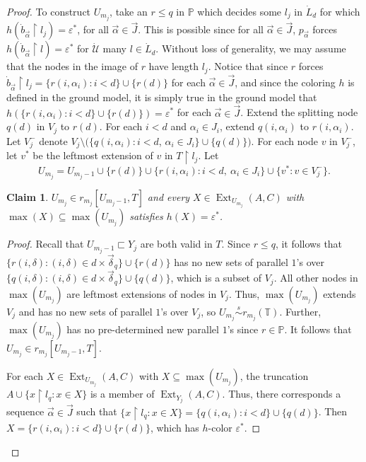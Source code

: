 \documentclass{amsart}
\newtheorem{claim}{Claim}
\theoremstyle{remark}
\theoremstyle{definition}
\theoremstyle{remark}
\newcommand{\al}{\alpha}
\newcommand{\sse}{\subseteq}
\DeclareMathOperator{\Ext}{Ext}
\newcommand{\re}{\restriction}
\newcommand{\bP}{\mathbb{P}}
\newcommand{\bT}{\mathbb{T}}
\newcommand{\ssim}{\stackrel{s}{\sim}}
\begin{document}
\begin{proof}
To construct $U_{m_j}$,
take an $r\le q$ in  $\bP$ which  decides some $l_j$ in $\dot{L}_d$ for which   $h(\dot{b}_{\vec\al}\re l_j)=\varepsilon^*$, for all $\vec\al\in\vec{J}$.
This is possible since for all $\vec\al\in\vec{J}$,
$p_{\vec\al}$ forces $h(\dot{b}_{\vec\al}\re l)=\varepsilon^*$ for $\dot{\mathcal{U}}$ many $l\in \dot{L}_d$.
Without loss of generality, we may assume that
 the nodes in the image of $r$ have length  $l_j$.
Notice that since
$r$ forces $\dot{b}_{\vec{\al}}\re l_j=\{r(i,\al_i):i<d\}\cup\{r(d)\}$ for each $\vec\al\in \vec{J}$,
and since the coloring $h$ is defined in the ground model,
it is simply true in the ground model that
$h(\{r(i,\al_i):i<d\}\cup\{r(d)\})=\varepsilon^*$ for each $\vec\al\in \vec{J}$.
Extend the splitting node $q(d)$ in $V_j$
to $r(d)$.
For each $i<d$ and $\al_i\in J_i$,
extend $q(i,\al_i)$ to $r(i,\al_i)$.
Let $V_j^-$ denote  $V_j\setminus(\{q(i,\al_i):i<d$, $\al_i\in J_i\}\cup \{q(d)\})$.
For each node $v$ in $V_j^-$,
let $v^*$ be the  leftmost extension of $v$ in $T\re l_j$.
Let
\begin{equation}
U_{m_j}= U_{m_j-1}\cup\{r(d)\}\cup\{r(i,\al_i):i<d,\ \al_i\in J_i\}\cup\{v^*:v\in V_j^-\}.
\end{equation}



\begin{claim}\label{claim.correct}
$U_{m_j}\in r_{m_j}[U_{m_j-1},T]$ and
every $X\in\Ext_{U_{m_j}}(A,C)$ with $\max(X)\sse\max(U_{m_j})$
 satisfies $h(X)=\varepsilon^*$.
\end{claim}


\begin{proof}
Recall that $U_{m_j-1}\sqsubset Y_j$ are both valid in $T$.
Since $r\le q$, it follows that
$\{r(i,\delta):(i,\delta)\in d\times\vec{\delta}_q\}\cup\{r(d)\}$
has no new  sets of parallel $1$'s  over
$\{q(i,\delta):(i,\delta)\in d\times\vec{\delta}_q\}\cup\{q(d)\}$, which is a subset of $V_j$.
All other nodes in $\max(U_{m_j})$ are leftmost extensions of nodes in $V_j$.
Thus,
$\max(U_{m_j})$  extends $V_j$ and has
no new sets of parallel $1$'s over  $V_j$,
so
 $U_{m_j}\ssim r_{m_j}(\bT)$.
Further, $\max(U_{m_j})$
has no pre-determined new parallel $1$'s since $r\in \bP$.
It follows that $U_{m_j}\in r_{m_j}[U_{m_j-1},T]$.



For each $X\in\Ext_{U_{m_j}}(A,C)$ with $X\sse\max(U_{m_j})$,
the truncation  $A\cup\{x\re l_q:x\in X\}$
is a member of $\Ext_{Y_j}(A,C)$.
Thus, there corresponds a sequence $\vec\al\in\vec{J}$ such that
$\{x\re l_q:x\in X\}=\{q(i,\al_i):i<d\}\cup\{q(d)\}$.
Then
 $X=\{r(i,\al_i):i<d\}\cup \{r(d)\}$,
 which  has $h$-color $\varepsilon^*$.
\end{proof}



\end{proof}
\end{document}

